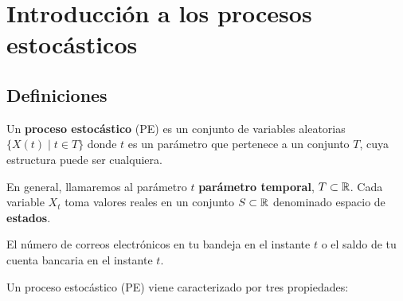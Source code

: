 \documentclass[PREyA.tex]{subfiles}
\begin{document}
\chapter{Introducción a los procesos estocásticos}
\section{Definiciones}
\begin{defi}
Un \textbf{proceso estocástico} (PE) es un conjunto de variables aleatorias $\{X(t) \mid t  \in T\}$ donde $t$ es un parámetro que pertenece a un conjunto $T$, cuya estructura puede ser cualquiera.
\end{defi}
\begin{nota}
En general, llamaremos al parámetro $t$ \textbf{parámetro temporal}, $T\subset \mathbb{R}$. Cada variable $X_t$ toma valores reales en un conjunto $S\subset \mathbb{R}$ denominado espacio de \textbf{estados}.
\end{nota}
\begin{example}
El número de correos electrónicos en tu bandeja en el instante $t$ o el saldo de tu cuenta bancaria en el instante $t$.
\end{example}

Un proceso estocástico (PE) viene caracterizado por tres propiedades:
\end{document}
